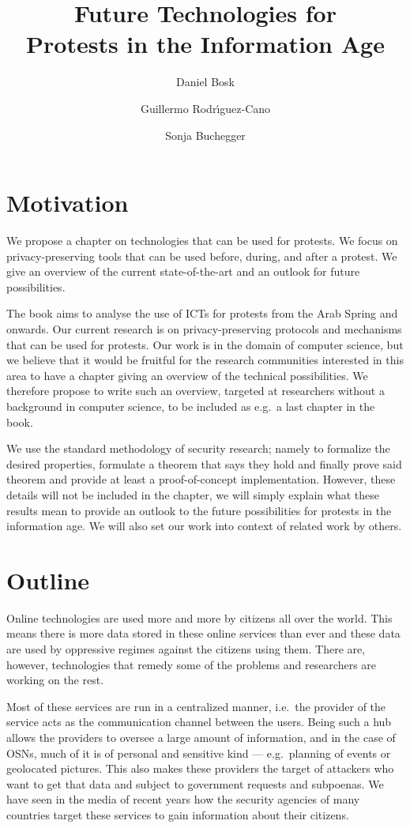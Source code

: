 \documentclass[a4paper]{llncs}
\title{%
  Future Technologies for\\
  Protests in the Information Age
}
\author{%
  Daniel Bosk
  \and
  Guillermo Rodr\'{\i}guez-Cano
  \and
  Sonja Buchegger
}
\institute{%
  Department of Theoretical Computer Science,\\
  School of Computer Science and Communication,\\
  KTH Royal Institute of Technology,
  Stockholm\\
  \email{\{dbosk,gurc,buc\}@kth.se}
}
\begin{document}
\maketitle


\section{Motivation}
\label{Motivation}

We propose a chapter on technologies that can be used for protests.
We focus on privacy-preserving tools that can be used before, during, and after 
a protest.
We give an overview of the current state-of-the-art and an outlook for future 
possibilities.

The book aims to analyse the use of \acp{ICT} for protests from the Arab Spring 
and onwards.
Our current research is on privacy-preserving protocols and mechanisms that 
can be used for protests.
Our work is in the domain of computer science, but we believe that it would 
be fruitful for the research communities interested in this area to have 
a chapter giving an overview of the technical possibilities.
We therefore propose to write such an overview, targeted at researchers without 
a background in computer science, to be included as e.g.\ a last chapter in the 
book.

We use the standard methodology of security research; namely to formalize the 
desired properties, formulate a theorem that says they hold and finally prove 
said theorem and provide at least a proof-of-concept implementation.
However, these details will not be included in the chapter, we will simply 
explain what these results mean to provide an outlook to the future 
possibilities for protests in the information age.
We will also set our work into context of related work by others.


\section{Outline}
\label{Outline}

Online technologies are used more and more by citizens all over the world.
This means there is more data stored in these online services than ever and 
these data are used by oppressive regimes against the citizens using them.
There are, however, technologies that remedy some of the problems
and researchers are working on the rest.

Most of these services are run in a centralized manner, i.e.\ the provider of 
the service acts as the communication channel between the users.
Being such a hub allows the providers to oversee a large amount of information, 
and in the case of \acp{OSN}, much of it is of personal and sensitive kind --- 
e.g.\ planning of events or geolocated pictures.
This also makes these providers the target of attackers who want to get that 
data and subject to government requests and subpoenas.
We have seen in the media of recent years how the security agencies of many 
countries target these services to gain information about their citizens.
\end{document}
